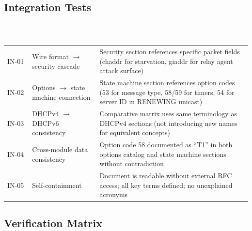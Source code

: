 \documentclass[11pt,letterpaper]{article}
\newcommand{\tableheader}[1]{\textbf{\sffamily\textcolor{white}{#1}}}
\begin{document}
\subsection{Integration Tests}

\begin{center}
\begin{tabularx}{\textwidth}{C{1.2cm}L{4cm}X}
\toprule
{}
\tableheader{Test ID} & \tableheader{Verifies} & \tableheader{Expected} \\
\midrule
IN-01 & Wire format $\to$ security cascade & Security section references specific packet fields (chaddr for starvation, giaddr for relay agent attack surface) \\
IN-02 & Options $\to$ state machine connection & State machine section references option codes (53 for message type, 58/59 for timers, 54 for server ID in RENEWING unicast) \\
IN-03 & DHCPv4 $\to$ DHCPv6 consistency & Comparative matrix uses same terminology as DHCPv4 sections (not introducing new names for equivalent concepts) \\
IN-04 & Cross-module data consistency & Option code 58 documented as ``T1'' in both options catalog and state machine sections without contradiction \\
IN-05 & Self-containment & Document is readable without external RFC access; all key terms defined; no unexplained acronyms \\
\bottomrule
\end{tabularx}
\end{center}

\subsection{Verification Matrix}
\end{document}
